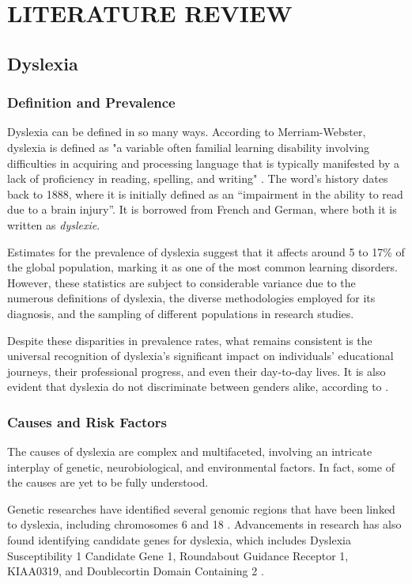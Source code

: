 \chapter{LITERATURE REVIEW}
\label{ch:litreview}


\section{Dyslexia}

\subsection{Definition and Prevalence}

Dyslexia can be defined in so many ways. According to Merriam-Webster, dyslexia is defined as "a variable often familial learning disability involving difficulties in acquiring and processing language that is typically manifested by a lack of proficiency in reading, spelling, and writing" \parencite{mw:dyslexia}. The word's history dates back to 1888, where it is initially defined as an ``impairment in the ability to read due to a brain injury''. It is borrowed from French and German, where both it is written as \emph{dyslexie}. 

Estimates for the prevalence of dyslexia suggest that it affects around 5 to 17\% \parencite{Ramli2020} of the global population, marking it as one of the most common learning disorders. However, these statistics are subject to considerable variance due to the numerous definitions of dyslexia, the diverse methodologies employed for its diagnosis, and the sampling of different populations in research studies.

Despite these disparities in prevalence rates, what remains consistent is the universal recognition of dyslexia's significant impact on individuals' educational journeys, their professional progress, and even their day-to-day lives. It is also evident that dyslexia do not discriminate between genders alike, according to \textcite{Guerin1993DyslexicSA}.


\subsection{Causes and Risk Factors}
The causes of dyslexia are complex and multifaceted, involving an intricate interplay of genetic, neurobiological, and environmental factors. In fact, some of the causes are yet to be fully understood. 

Genetic researches have identified several genomic regions that have been linked to dyslexia, including chromosomes 6 and 18 \parencite{Francks2002, Schumacher2007}. Advancements in research has also found identifying candidate genes for dyslexia, which includes Dyslexia Susceptibility 1 Candidate Gene 1, Roundabout Guidance Receptor 1, KIAA0319, and Doublecortin Domain Containing 2 \parencite{Paracchini2007}. 

